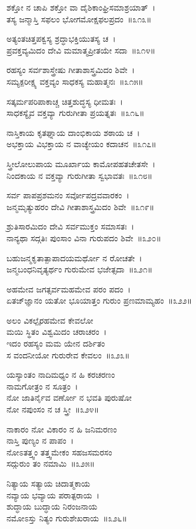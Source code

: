 ಶಕ್ತೋ ನ ಚಾಪಿ ಶಕ್ತೋ ವಾ ದೈಶಿಕಾಂಘ್ರಿಸಮಾಶ್ರಯಾತ್~।\\
ತಸ್ಯ ಜನ್ಮಾಸ್ತಿ ಸಫಲಂ ಭೋಗಮೋಕ್ಷಫಲಪ್ರದಂ~॥೩೧೩॥

ಅತ್ಯಂತಚಿತ್ತಪಕ್ವಸ್ಯ ಶ್ರದ್ಧಾಭಕ್ತಿಯುತಸ್ಯ ಚ~।\\
ಪ್ರವಕ್ತವ್ಯಮಿದಂ ದೇವಿ ಮಮಾತ್ಮಪ್ರೀತಯೇ ಸದಾ~॥೩೧೪॥

ರಹಸ್ಯಂ ಸರ್ವಶಾಸ್ತ್ರೇಷು ಗೀತಾಶಾಸ್ತ್ರಮಿದಂ ಶಿವೇ~।\\
ಸಮ್ಯಕ್ಪರೀಕ್ಷ್ಯ ವಕ್ತವ್ಯಂ ಸಾಧಕಸ್ಯ ಮಹಾತ್ಮನಃ~॥೩೧೫॥

ಸತ್ಕರ್ಮಪರಿಪಾಕಾಚ್ಚ ಚಿತ್ತಶುದ್ಧಸ್ಯ ಧೀಮತಃ~।\\
ಸಾಧಕಸ್ಯೈವ ವಕ್ತವ್ಯಾ ಗುರುಗೀತಾ ಪ್ರಯತ್ನತಃ~॥೩೧೬॥

ನಾಸ್ತಿಕಾಯ ಕೃತಘ್ನಾಯ ದಾಂಭಿಕಾಯ ಶಠಾಯ ಚ~।\\
ಅಭಕ್ತಾಯ ವಿಭಕ್ತಾಯ ನ ವಾಚ್ಯೇಯಂ ಕದಾಚನ~॥೩೧೭॥

ಸ್ತ್ರೀಲೋಲುಪಾಯ ಮೂರ್ಖಾಯ ಕಾಮೋಪಹತಚೇತಸೇ~।\\
ನಿಂದಕಾಯ ನ ವಕ್ತವ್ಯಾ ಗುರುಗೀತಾ ಸ್ವಭಾವತಃ~॥೩೧೮॥

ಸರ್ವ ಪಾಪಪ್ರಶಮನಂ ಸರ್ವೋಪದ್ರವವಾರಕಂ~।\\
ಜನ್ಮಮೃತ್ಯುಹರಂ ದೇವಿ ಗೀತಾಶಾಸ್ತ್ರಮಿದಂ ಶಿವೇ~॥೩೧೯॥

ಶ್ರುತಿಸಾರಮಿದಂ ದೇವಿ ಸರ್ವಮುಕ್ತಂ ಸಮಾಸತಃ~।\\
ನಾನ್ಯಥಾ ಸದ್ಗತಿಃ ಪುಂಸಾಂ ವಿನಾ ಗುರುಪದಂ ಶಿವೇ~॥೩೨೦॥

ಬಹುಜನ್ಮಕೃತಾತ್ಪಾಪಾದಯಮರ್ಥೋ ನ ರೋಚತೇ~।\\
ಜನ್ಮಬಂಧನಿವೃತ್ಯರ್ಥಂ ಗುರುಮೇವ ಭಜೇತ್ಸದಾ~॥೩೨೧॥

ಅಹಮೇವ ಜಗತ್ಸರ್ವಮಹಮೇವ ಪರಂ ಪದಂ~।\\
ಏತಜ್‌ಜ್ಞಾನಂ ಯತೋ ಭೂಯಾತ್ತಂ ಗುರುಂ ಪ್ರಣಮಾಮ್ಯಹಂ~॥೩೨೨॥

ಅಲಂ ವಿಕಲ್ಪೈರಹಮೇವ ಕೇವಲೋ\\ ಮಯಿ ಸ್ಥಿತಂ ವಿಶ್ವಮಿದಂ ಚರಾಚರಂ~।\\
ಇದಂ ರಹಸ್ಯಂ ಮಮ ಯೇನ ದರ್ಶಿತಂ\\ ಸ ವಂದನೀಯೋ ಗುರುರೇವ ಕೇವಲಂ~॥೩೨೩॥

ಯಸ್ಯಾಂತಂ ನಾದಿಮಧ್ಯಂ ನ ಹಿ ಕರಚರಣಂ \\ನಾಮಗೋತ್ರಂ ನ ಸೂತ್ರಂ~।\\
ನೋ ಜಾತಿರ್ನೈವ ವರ್ಣೋ ನ ಭವತಿ ಪುರುಷೋ\\ ನೋ ನಪುಂಸಂ ನ ಚ ಸ್ತ್ರೀ~॥೩೨೪॥

ನಾಕಾರಂ ನೋ ವಿಕಾರಂ ನ ಹಿ ಜನಿಮರಣಂ \\ನಾಸ್ತಿ ಪುಣ್ಯಂ ನ ಪಾಪಂ~।\\
ನೋಽತತ್ತ್ವಂ ತತ್ತ್ವಮೇಕಂ ಸಹಜಸಮರಸಂ \\ಸದ್ಗುರುಂ ತಂ ನಮಾಮಿ~॥೩೨೫॥

ನಿತ್ಯಾಯ ಸತ್ಯಾಯ ಚಿದಾತ್ಮಕಾಯ \\ನವ್ಯಾಯ ಭವ್ಯಾಯ ಪರಾತ್ಪರಾಯ~।\\
ಶುದ್ಧಾಯ ಬುದ್ಧಾಯ ನಿರಂಜನಾಯ\\ ನಮೋಽಸ್ತು ನಿತ್ಯಂ ಗುರುಶೇಖರಾಯ~॥೩೨೬॥

